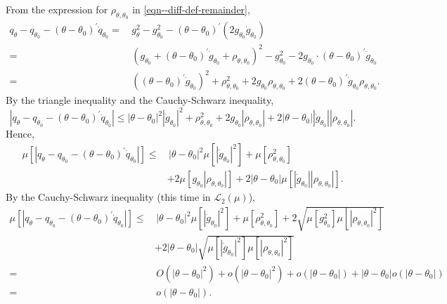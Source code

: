 From the expression for \(\rho_{\theta, \theta_{0}}\) in
\eqref{eqn--diff-def-remainder},
\begin{align*}
  q_{\theta} - q_{\theta_{0}} - (\theta - \theta_{0})^{\prime}
  \dot{q}_{\theta_{0}} =
  & \,
  g_{\theta}^{2} - g_{\theta_{0}}^{2} - (\theta - \theta_{0})^{\prime} \left( 2
  g_{\theta_{0}} \dot{g}_{\theta_{0}} \right) \\
  =
  & \, \left( g_{\theta_{0}} + (\theta - \theta_{0})^{\prime}
  \dot{g}_{\theta_{0}} + \rho_{\theta, \theta_{0}} \right)^{2} -
  g_{\theta_{0}}^{2} - 2 g_{\theta_{0}} \cdot (\theta - \theta_{0})^{\prime}
  \dot{g}_{\theta_{0}} \\
  =
  & \, \left( (\theta - \theta_{0})^{\prime} \dot{g}_{\theta_{0}} \right)^{2} +
  \rho_{\theta, \theta_{0}}^{2} + 2 g_{\theta_{0}} \rho_{\theta, \theta_{0}} + 2
  (\theta - \theta_{0})^{\prime} \dot{g}_{\theta_{0}} \rho_{\theta, \theta_{0}}.
\end{align*}
By the triangle inequality and the Cauchy-Schwarz inequality,
\begin{equation*}
  \left| q_{\theta} - q_{\theta_{0}} - (\theta - \theta_{0})^{\prime}
  \dot{q}_{\theta_{0}} \right| \leq |\theta - \theta_{0}|^{2} \left|
  \dot{g}_{\theta_{0}} \right|^{2} + \rho_{\theta, \theta_{0}}^{2} + 2
  g_{\theta_{0}} \left| \rho_{\theta, \theta_{0}} \right| + 2 |\theta -
  \theta_{0}| \left| \dot{g}_{\theta_{0}} \right| \left| \rho_{\theta,
  \theta_{0}} \right|.
\end{equation*}
Hence,
\begin{equation*}
  \begin{split}
    \mu \left[ \left| q_{\theta} - q_{\theta_{0}} - (\theta -
    \theta_{0})^{\prime} \dot{q}_{\theta_{0}} \right| \right] \leq
    & \, |\theta - \theta_{0}|^{2} \mu \left[ \left| \dot{g}_{\theta_{0}}
    \right|^{2} \right] + \mu \left[ \rho_{\theta, \theta_{0}}^{2} \right] \\
    & + 2 \mu \left[ g_{\theta_{0}} \left| \rho_{\theta, \theta_{0}} \right|
    \right] + 2 |\theta - \theta_{0}| \mu \left[ \left| \dot{g}_{\theta_{0}}
    \right| \left| \rho_{\theta, \theta_{0}} \right| \right].
  \end{split}
\end{equation*}
By the Cauchy-Schwarz inequality (this time in \(\mathscr{L}_{2} (\mu)\)),
\begin{align*}
  \mu \left[ \left| q_{\theta} - q_{\theta_{0}} - (\theta - \theta_{0})^{\prime}
  \dot{q}_{\theta_{0}} \right| \right] \leq
  & \, |\theta - \theta_{0}|^{2} \mu \left[ \left| \dot{g}_{\theta_{0}}
  \right|^{2} \right] + \mu \left[ \rho_{\theta, \theta_{0}}^{2} \right] + 2
  \sqrt{\mu \left[ g_{\theta_{0}}^{2} \right] \mu \left[ \left| \rho_{\theta,
  \theta_{0}} \right|^{2} \right]} \\
  & + 2 |\theta - \theta_{0}| \sqrt{\mu \left[ \left| \dot{g}_{\theta_{0}}
  \right|^{2} \right] \mu \left[ \left| \rho_{\theta, \theta_{0}} \right|^{2}
  \right]} \\
  =
  & \, O \left( |\theta - \theta_{0}|^{2} \right) + o \left( |\theta -
  \theta_{0}|^{2} \right) + o \left( |\theta - \theta_{0}| \right) + |\theta -
  \theta_{0}| o (|\theta - \theta_{0}|) \\
  =
  & \, o (|\theta - \theta_{0}|).
\end{align*}
